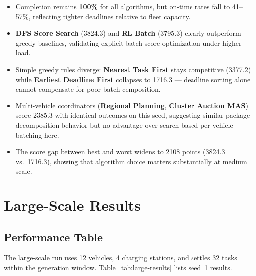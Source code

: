\begin{itemize}[leftmargin=4em]
    \item Completion remains \textbf{100\%} for all algorithms, but on-time rates fall to 41--57\%, reflecting tighter deadlines relative to fleet capacity.
    \item \textbf{DFS Score Search} (3824.3) and \textbf{RL Batch} (3795.3) clearly outperform greedy baselines, validating explicit batch-score optimization under higher load.
    \item Simple greedy rules diverge: \textbf{Nearest Task First} stays competitive (3377.2) while \textbf{Earliest Deadline First} collapses to 1716.3 --- deadline sorting alone cannot compensate for poor batch composition.
    \item Multi-vehicle coordinators (\textbf{Regional Planning}, \textbf{Cluster Auction MAS}) score 2385.3 with identical outcomes on this seed, suggesting similar package-decomposition behavior but no advantage over search-based per-vehicle batching here.
    \item The score gap between best and worst widens to 2108 points (3824.3 vs.\ 1716.3), showing that algorithm choice matters substantially at medium scale.
\end{itemize}

\section{Large-Scale Results}

\subsection{Performance Table}

The large-scale run uses 12 vehicles, 4 charging stations, and settles 32 tasks within the generation window. Table~\ref{tab:large-results} lists seed~1 results.


